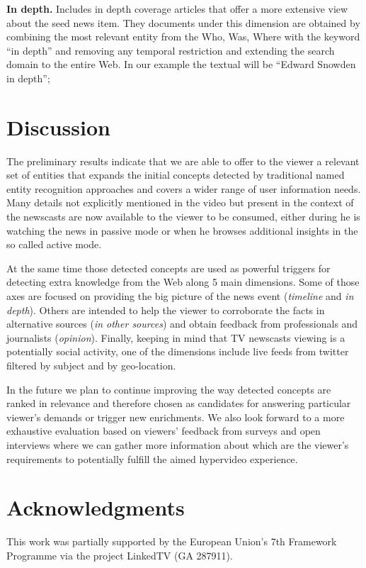 \documentclass{llncs}
\begin{document}
\textbf{In depth.} Includes in depth coverage articles that offer a more extensive view about the seed news item. They documents under this dimension are obtained by combining the most relevant entity from the Who, Was, Where with the keyword ``in depth'' and removing any temporal restriction and extending the search domain to the entire Web. In our example the textual will be ``Edward Snowden in depth'';
		

\section{Discussion}
\label{sec:discussion}
The preliminary results indicate that we are able to offer to the viewer a relevant set of entities that expands the initial concepts detected by traditional named entity recognition approaches and covers a wider range of user information needs. Many details not explicitly mentioned in the video but present in the context of the newscasts are now available to the viewer to be consumed, either during he is watching the news in passive mode or when he browses additional insights in the so called active mode.

At the same time those detected concepts are used as powerful triggers for detecting extra knowledge from the Web along 5 main dimensions. Some of those axes are focused on providing the big picture of the news event (\emph{timeline} and \emph{in depth}). Others are intended to help the viewer to corroborate the facts in alternative sources (\emph{in other sources}) and obtain feedback from professionals and journalists (\emph{opinion}). Finally, keeping in mind that TV newscasts viewing is a potentially social activity, one of the dimensions include live feeds from twitter filtered by subject and by geo-location. 

In the future we plan to continue improving the way detected concepts are ranked in relevance and therefore chosen as candidates for answering particular viewer's demands or trigger new enrichments. We also look forward to a more exhaustive evaluation based on viewers' feedback from surveys and open interviews where we can gather more information about which are the viewer's requirements to potentially fulfill the aimed hypervideo experience.


\section*{Acknowledgments}
This work was partially supported by the European Union's 7th Framework Programme via the project LinkedTV (GA 287911).



\end{document}

